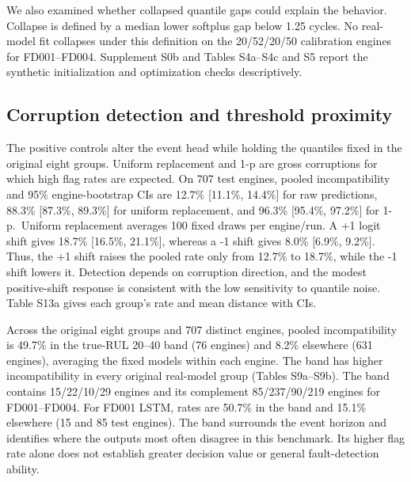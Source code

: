 \documentclass[IJPHM, 2026, 0]{phmsociety}
\begin{document}
We also examined whether collapsed quantile gaps could explain the behavior. Collapse is defined by a median lower softplus gap below \mbox{1.25} cycles. No real-model fit collapses under this definition on the \mbox{20}/\mbox{52}/\mbox{20}/\mbox{50} calibration engines for FD001--FD004. Supplement S0b and Tables S4a--S4c and S5 report the synthetic initialization and optimization checks descriptively.

\subsection{Corruption detection and threshold proximity}\label{corruption-detection-and-threshold-proximity}

The positive controls alter the event head while holding the quantiles fixed in the original eight groups. Uniform replacement and \mbox{1}-p are gross corruptions for which high flag rates are expected. On \mbox{707} test engines, pooled incompatibility and \mbox{95}\% engine-bootstrap CIs are \mbox{12.7}\% {[}\mbox{11.1}\%, \mbox{14.4}\%{]} for raw predictions, \mbox{88.3}\% {[}\mbox{87.3}\%, \mbox{89.3}\%{]} for uniform replacement, and \mbox{96.3}\% {[}\mbox{95.4}\%, \mbox{97.2}\%{]} for \mbox{1}-p.~Uniform replacement averages \mbox{100} fixed draws per engine/run. A \mbox{+1} logit shift gives \mbox{18.7}\% {[}\mbox{16.5}\%, \mbox{21.1}\%{]}, whereas a \mbox{-1} shift gives \mbox{8.0}\% {[}\mbox{6.9}\%, \mbox{9.2}\%{]}. Thus, the \mbox{+1} shift raises the pooled rate only from \mbox{12.7}\% to \mbox{18.7}\%, while the \mbox{-1} shift lowers it. Detection depends on corruption direction, and the modest positive-shift response is consistent with the low sensitivity to quantile noise. Table S13a gives each group's rate and mean distance with CIs.

Across the original eight groups and \mbox{707} distinct engines, pooled incompatibility is \mbox{49.7}\% in the true-RUL \mbox{20}--\mbox{40} band (\mbox{76} engines) and \mbox{8.2}\% elsewhere (\mbox{631} engines), averaging the fixed models within each engine. The band has higher incompatibility in every original real-model group (Tables S9a--S9b). The band contains \mbox{15}/\mbox{22}/\mbox{10}/\mbox{29} engines and its complement \mbox{85}/\mbox{237}/\mbox{90}/\mbox{219} engines for FD001--FD004. For FD001 LSTM, rates are \mbox{50.7}\% in the band and \mbox{15.1}\% elsewhere (\mbox{15} and \mbox{85} test engines). The band surrounds the event horizon and identifies where the outputs most often disagree in this benchmark. Its higher flag rate alone does not establish greater decision value or general fault-detection ability.
\end{document}
